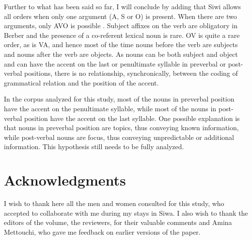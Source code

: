 \documentclass[output=paper]{langsci/langscibook}
\begin{document}
Further to what has been said so far, I will conclude by adding that Siwi allows all orders when only one argument (A, S or O) is present. When there are two arguments, only AVO is possible \citep[][288-289]{mettouchi:schiattarella:18}. Subject affixes on the verb are obligatory in Berber and the presence of a co-referent lexical noun is rare. OV is quite a rare order, as is VA, and hence most of the time nouns before the verb are subjects and nouns after the verb are objects. As nouns can be both subject and object and can have the accent on the last or penultimate syllable in preverbal or post-verbal positions, there is no relationship, synchronically, between the coding of grammatical relation and the position of the accent.

In the corpus analyzed for this study, most of the nouns in preverbal position have the accent on the penultimate syllable, while most of the nouns in post-verbal position have the accent on the last syllable. One possible explanation is that nouns in preverbal position are topics, thus conveying known information, while post-verbal nouns are focus, thus conveying unpredictable or additional information. This hypothesis still needs to be fully analyzed.

\section*{Acknowledgments}
I wish to thank here all the men and women consulted for this study, who accepted to collaborate with me during my stays in Siwa. I also wish to thank the editors of the volume, the reviewers, for their valuable comments and Amina Mettouchi, who gave me feedback on earlier versions of the paper.
\end{document}
